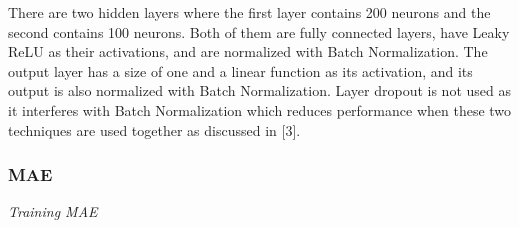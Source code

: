 \documentclass[12pt]{article}
\begin{document}
    \quad There are two hidden layers where the first layer contains 200 neurons and the second contains 100 neurons. Both of them are fully connected layers, have Leaky ReLU as their activations, and are normalized with Batch Normalization. The output layer has a size of one and a linear function as its activation, and its output is also normalized with Batch Normalization. Layer dropout is not used as it interferes with Batch Normalization which reduces performance when these two techniques are used together as discussed in [3].

    \newpage\subsubsection{MAE}

        \begin{center}
          \textit{Training MAE}


\end{center}
\end{document}
